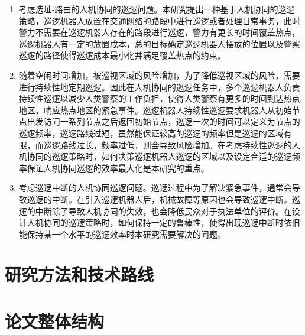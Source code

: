 \documentclass[finalformat,mathCMR]{HUSTthesis}
\begin{document}
\begin{enumerate}
	\item 考虑选址-路由的人机协同的巡逻问题。本研究提出一种基于人机协同的巡逻策略，巡逻机器人放置在交通网络的路段中进行巡逻或者处理日常事务，此时警力不需要在巡逻机器人存在的路段进行巡逻，警力有更长的时间覆盖热点，巡逻机器人有一定的放置成本，总的目标确定巡逻机器人摆放的位置以及警察巡逻的路径使得巡逻成本最小化并满足覆盖热点的约束。
	\item 随着空闲时间增加，被巡视区域的风险增加，为了降低巡视区域的风险，需要进行持续性地定期巡逻。因此在人机协同的巡逻任务中，多个巡逻机器人负责持续性巡逻以减少人类警察的工作负担，使得人类警察有更多的时间到达热点地区，响应热点地区的紧急事件。巡逻机器人持续性巡逻要求机器人从初始节点出发访问一系列节点之后返回初始节点，巡逻一次的时间可以定义为节点的巡逻频率，巡逻路线过短，虽然能保证较高的巡逻的频率但是巡逻的区域有限，而巡逻路线过长，频率过低，则会导致风险增加。在考虑持续性巡逻的人机协同的巡逻策略时，如何决策巡逻机器人巡逻的区域以及设定合适的巡逻频率保证人机协同巡逻的效率最大化是本研究的重点。
	\item 考虑巡逻中断的人机协同巡逻问题。巡逻过程中为了解决紧急事件，通常会导致巡逻的中断。在引入巡逻机器人后，机械故障等原因也会导致巡逻中断。巡逻的中断除了导致人机协同的失效，也会降低民众对于执法单位的评价。在设计人机协同的巡逻策略时，如何保持一定的鲁棒性，使得出现巡逻中断时依旧能保持某一个水平的巡逻效率时本研究需要解决的问题。
\end{enumerate}

\section{研究方法和技术路线}

\section{论文整体结构}
\end{document}
